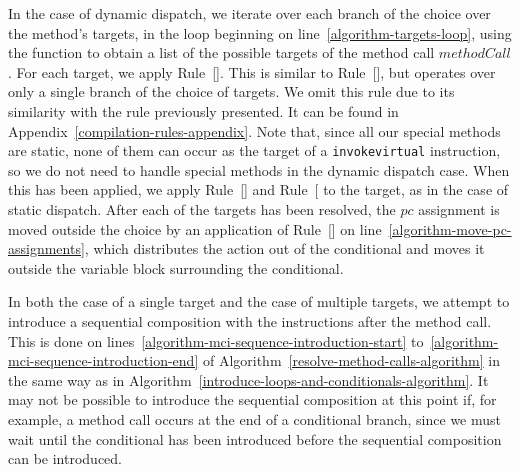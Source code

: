 In the case of dynamic dispatch, we iterate over each branch of the
choice over the method's targets, in the loop beginning on
line~\ref{algorithm-targets-loop}, using the function
 to obtain a list of the possible targets
of the method call $methodCall$.
For each target, we apply
Rule~[].
This is similar to Rule~[], but
operates over only a single branch of the choice of targets.
We omit this rule due to its similarity with the rule previously
presented.
It can be found in Appendix~\ref{compilation-rules-appendix}.
Note that, since all our special methods are static, none of them can
occur as the target of a \texttt{invokevirtual} instruction, so we do
not need to handle special methods in the dynamic dispatch case. 
When this has been applied, we apply
Rule~[]
and
Rule~[
to the target, as in the case of static dispatch.
After each of the targets has been resolved, the $pc$ assignment is
moved outside the choice by an application of
Rule~[] on
line~\ref{algorithm-move-pc-assignments}, which distributes the action
out of the conditional and moves it outside the variable block
surrounding the conditional.

In both the case of a single target and the case of multiple targets,
we attempt to introduce a sequential composition with the instructions
after the method call.
This is done on lines~\ref{algorithm-mci-sequence-introduction-start}
to~\ref{algorithm-mci-sequence-introduction-end} of
Algorithm~\ref{resolve-method-calls-algorithm} in the same way as in
Algorithm~\ref{introduce-loops-and-conditionals-algorithm}.
It may not be possible to introduce the sequential composition at this
point if, for example, a method call occurs at the end of a
conditional branch, since we must wait until the conditional has been
introduced before the sequential composition can be introduced.

